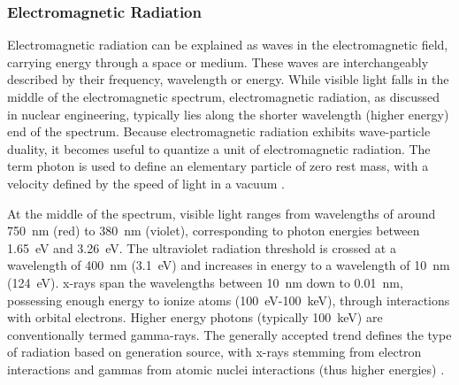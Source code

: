 \documentclass[../../../../main.tex]{subfiles}
\begin{document}
%
    \subsubsection{Electromagnetic Radiation}%
    \label{sec:chapter-2:radiation-detection:types-of-radiation:electromagnetic-radiation}%
    Electromagnetic radiation can be explained as waves in the electromagnetic field, carrying energy through a space or medium.
    These waves are interchangeably described by their frequency, wavelength or energy.
    While visible light falls in the middle of the electromagnetic spectrum, electromagnetic radiation, as discussed in nuclear engineering, typically lies along the shorter wavelength (higher energy) end of the spectrum.  
    Because electromagnetic radiation exhibits wave-particle duality, it becomes useful to quantize a unit of electromagnetic radiation. 
    The term photon is used to define an elementary particle of zero rest mass, with a velocity defined by the speed of light in a vacuum \cite{book:Leroy_2004}.
    \par%
    At the middle of the spectrum, visible light ranges from wavelengths of around \SI{750}{\nano\meter} (red) to \SI{380}{\nano\meter} (violet), corresponding to photon energies between \SI{1.65}{\electronvolt} and \SI{3.26}{\electronvolt}.
    The ultraviolet radiation threshold is crossed at a wavelength of \SI{400}{\nano\meter} (\SI{3.1}{\electronvolt}) and increases in energy to a wavelength of \SI{10}{\nano\meter} (\SI{124}{\electronvolt}).
    \Glspl{x-ray} span the wavelengths between \SI{10}{\nano\meter} down to \SI{0.01}{\nano\meter}, possessing enough energy to ionize atoms (\SI{100}{\electronvolt}{\--}\SI{100}{\kilo\electronvolt}), through interactions with orbital electrons.
    Higher energy photons (typically \Xmath{>}\SI{100}{\kilo\electronvolt}) are conventionally termed \glspl{gamma-ray}.
    The generally accepted trend defines the type of radiation based on generation source, with \glspl{x-ray} stemming from electron interactions and gammas from atomic nuclei interactions (thus higher energies) \cite{book:Podgorsak_2006}.
\end{document}
